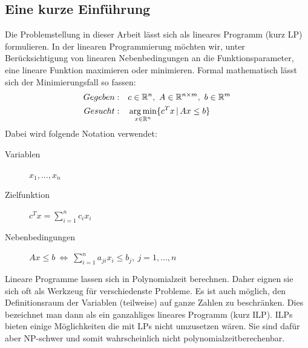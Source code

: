 \subsection{Eine kurze Einführung}
Die Problemstellung in dieser Arbeit lässt sich als lineares Programm (kurz LP) formulieren. In der linearen Programmierung möchten wir, unter Berücksichtigung von linearen Nebenbedingungen an die Funktionsparameter, eine lineare Funktion maximieren oder minimieren.
Formal mathematisch lässt sich der Minimierungsfall so fassen:
\begin{align*}
	Gegeben:&\quad c \in \mathbb{R}^{n},\ A \in \mathbb{R}^{n \times m},\ b \in \mathbb{R}^{m} \\
	Gesucht:&\quad \operatorname*{arg\,min}_{ x\in \mathbb{R}^n}\{c^Tx\,|\, Ax \leq b\}
\end{align*}
Dabei wird folgende Notation verwendet:
\begin{description}
\item[\quad Variablen] $x_1,..., x_n$
\item[\quad Zielfunktion]  $c^Tx = \sum_{i=1}^n c_i x_i$
\item[\quad Nebenbedingungen]  $Ax \leq b \ \Leftrightarrow\ \sum_{i=1}^n a_{ji} x_i \leq b_j, \ j = 1,...,n$
\end{description}
Lineare Programme lassen sich in Polynomialzeit berechnen. Daher eignen sie sich oft als Werkzeug für verschiedenste Probleme. Es ist auch möglich, den Definitionsraum der Variablen (teilweise) auf ganze Zahlen zu beschränken. Dies bezeichnet man dann als ein ganzahliges lineares Programm (kurz ILP). ILPs bieten einige Möglichkeiten die mit LPs nicht umzusetzen wären. Sie sind dafür aber NP-schwer und somit wahrscheinlich nicht polynomialzeitberechenbar.

